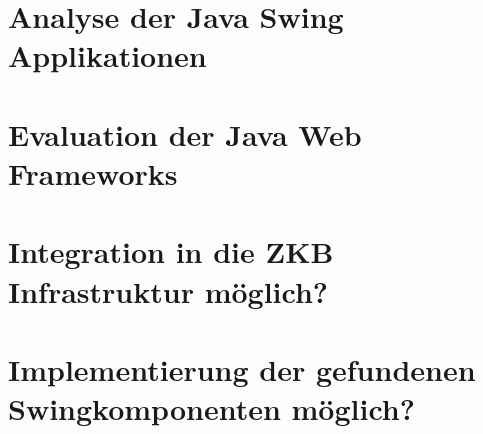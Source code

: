 \documentclass[
11pt, %
a4paper, %
BCOR25mm, %
DIV14, %
footsepline = false, %
headsepline, %
twoside, %
openright,
abstracton, %
listof=totocnumbered, %
bibliography=totocnumbered %
]{scrreprt}
\begin{document}
  

  \cleardoublepage
   
   
  \chapter{Analyse der Java Swing
  Applikationen}\label{chapter:AnalyseDerJavaSwingApplikationen}
  
  

  \cleardoublepage
  
  
  \chapter{Evaluation der Java Web
  Frameworks}\label{chapter:EvaluationDerJavaWebFrameworks}
  
   
  
  \cleardoublepage
  
   
  \chapter{Integration in die ZKB Infrastruktur
  möglich?}\label{chapter:IntegrationInDieZkbInfrastrukutr}
  
  

  \cleardoublepage

   
  \chapter{Implementierung der gefundenen Swingkomponenten
  möglich?}\label{chapter:ImplementierungDerGefundenenSwingkomponenten}
  
\end{document}
